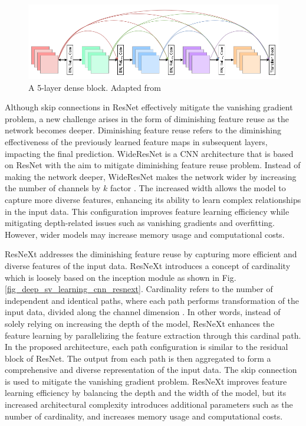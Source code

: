 \documentclass[preprint,12pt]{elsarticle}
\begin{document}
\begin{figure}[h!]
    \centering
    \includegraphics[scale=0.45]{fig_deep_sv_learning_cnn_densenet.png}
    \caption{A 5-layer dense block. Adapted from \citep{huang_densely_2017}}
    \label{fig_deep_sv_learning_cnn_densenet}
\end{figure}

Although skip connections in ResNet effectively mitigate the vanishing gradient problem, a new challenge arises in the form of diminishing feature reuse as the network becomes deeper. Diminishing feature reuse refers to the diminishing effectiveness of the previously learned feature maps in subsequent layers, impacting the final prediction. WideResNet is a CNN architecture that is based on ResNet with the aim to mitigate diminishing feature reuse problem. Instead of making the network deeper, WideResNet makes the network wider by increasing the number of channels by $k$ factor \citep{zagoruyko_wide_2017}. The increased width allows the model to capture more diverse features, enhancing its ability to learn complex relationships in the input data. This configuration improves feature learning efficiency while mitigating depth-related issues such as vanishing gradients and overfitting. However, wider models may increase memory usage and computational costs.

ResNeXt addresses the diminishing feature reuse by capturing more efficient and diverse features of the input data. ResNeXt introduces a concept of cardinality which is loosely based on the inception module as shown in Fig. \ref{fig_deep_sv_learning_cnn_resnext}. Cardinality refers to the number of independent and identical paths, where each path performs transformation of the input data, divided along the channel dimension  \citep{xie_aggregated_2017}. In other words, instead of solely relying on increasing the depth of the model, ResNeXt enhances the feature learning by parallelizing the feature extraction through this cardinal path. In the proposed architecture, each path configuration is similar to the residual block of ResNet. The output from each path is then aggregated to form a comprehensive and diverse representation of the input data. The skip connection is used to mitigate the vanishing gradient problem. ResNeXt improves feature learning efficiency by balancing the depth and the width of the model, but its increased architectural complexity introduces additional parameters such as the number of cardinality, and increases memory usage and computational costs.
\end{document}
